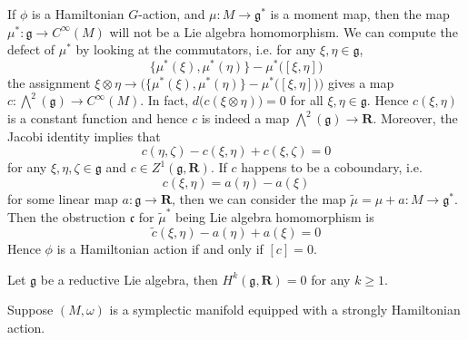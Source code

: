 \documentclass[
11pt, %
letterpaper， %
oneside, %
headinclude,footinclude, %
BCOR5mm, %
]{scrartcl}
\newcommand{\R}{{\mathbf{R}}}
\begin{document}
\begin{rem}
	If $\phi$ is a Hamiltonian $G$-action, and $\mu: M\to \mathfrak{g}^*$ is a moment map, then the map $\mu^*:\mathfrak{g}\to C^{\infty}(M)$ will not be a Lie algebra homomorphism. We can compute the defect of $\mu^*$ by looking at the commutators, i.e. for any $\xi, \eta \in \mathfrak{g}$,
	\begin{equation*}
	\{\mu^*(\xi), \mu^*(\eta) \}-\mu^*\big([\xi, \eta] \big)
	\end{equation*}
	the assignment $\xi \otimes \eta \to \Big(\{\mu^*(\xi), \mu^*(\eta) \}-\mu^*\big([\xi, \eta] \big) \Big)$ gives a map $c:\bigwedge^2(\mathfrak{g}) \to C^{\infty}(M)$. In fact, $d\big(c(\xi \otimes \eta) \big)=0$ for all $\xi, \eta \in \mathfrak{g}$. Hence $c(\xi, \eta)$ is a constant function and hence $c$ is indeed a map $ \bigwedge^2(\mathfrak{g})\to \R$. Moreover, the Jacobi identity implies that 
	\begin{equation*}
	c(\eta,\zeta)-c(\xi,\eta)+c(\xi,\zeta)=0
	\end{equation*}
	for any $\xi, \eta, \zeta \in \mathfrak{g}$ and $c\in Z^1(\mathfrak{g}, \R)$. If $c$ happens to be a coboundary, i.e. 
	\begin{equation*}
	c(\xi, \eta)= a(\eta)-a(\xi)
	\end{equation*}
	for some linear map $a: \mathfrak{g} \to \R$, then we can consider the map $\tilde{\mu}=\mu+a: M \to \mathfrak{g}^*$. Then the obstruction $\mathfrak{c}$ for $\tilde{\mu}^*$ being Lie algebra homomorphism is 
	\begin{equation*}
	\tilde{c}(\xi, \eta)-a(\eta)+a(\xi)=0
	\end{equation*}
	Hence $\phi$ is a Hamiltonian action if and only if $[c]=0$.
\end{rem}

\begin{thm} Let $\mathfrak{g}$ be a reductive Lie algebra, then $H^k(\mathfrak{g}, \R)=0$ for any $k\ge 1$.
\end{thm}

Suppose $(M,\omega)$ is a symplectic manifold equipped with a strongly Hamiltonian action.
\end{document}
